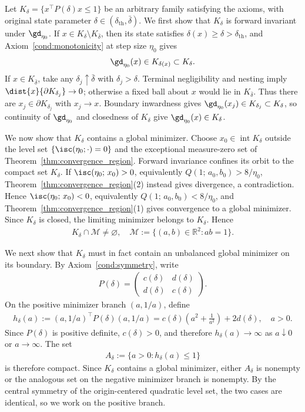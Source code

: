 \documentclass{article}
\begin{document}
Let $K_\delta=\{x^\top P(\delta)x\le 1\}$ be an arbitrary family satisfying
the axioms, with original state parameter
$\delta\in(\delta_{\mathrm{th}},\bar\delta)$. We first show that $K_\delta$
is forward invariant under $\gd_{\eta_0}$. If
$x\in K_\delta\setminus K_{\bar\delta}$, then its state satisfies
$\delta(x)\ge \delta>\delta_{\mathrm{th}}$, and
Axiom~\ref{cond:monotonicity} at step size $\eta_0$ gives
\begin{align}
\gd_{\eta_0}(x)\in K_{\delta(x)}\subset K_\delta .
\end{align}
If $x\in K_{\bar\delta}$, take any $\delta_j\uparrow\bar\delta$ with
$\delta_j>\delta$. Terminal negligibility and nesting imply
$\dist{x}{\partial K_{\delta_j}}\to0$; otherwise a fixed ball about $x$ would
lie in $K_{\bar\delta}$. Thus there are
$x_j\in\partial K_{\delta_j}$ with $x_j\to x$. Boundary inwardness gives
$\gd_{\eta_0}(x_j)\in K_{\delta_j}\subset K_\delta$, so continuity of
$\gd_{\eta_0}$ and closedness of $K_\delta$ give
$\gd_{\eta_0}(x)\in K_\delta$.

We now show that $K_\delta$ contains a global minimizer. Choose
$x_0\in\operatorname{int}K_\delta$ outside the level set
$\{\isc(\eta_0;\cdot)=0\}$ and the exceptional measure-zero set of
Theorem~\ref{thm:convergence_region}. Forward invariance confines its orbit to
the compact set $K_\delta$. If $\isc(\eta_0;\,x_0)>0$, equivalently
$Q(1;\,a_0,b_0)>8/\eta_0$, Theorem~\ref{thm:convergence_region}(2) instead
gives divergence, a contradiction. Hence $\isc(\eta_0;\,x_0)<0$, equivalently
$Q(1;\,a_0,b_0)<8/\eta_0$, and
Theorem~\ref{thm:convergence_region}(1) gives convergence to a global
minimizer. Since $K_\delta$ is closed, the limiting minimizer belongs to
$K_\delta$. Hence
\begin{align}
K_\delta\cap\mathcal M\neq\varnothing,
\quad
\mathcal M:=\{(a,b)\in\mathbb R^2:ab=1\}.
\end{align}

We next show that $K_\delta$ must in fact contain an unbalanced global
minimizer on its boundary. By Axiom~\ref{cond:symmetry}, write
\begin{align}
P(\delta)
=
\begin{pmatrix}
c(\delta) & d(\delta) \\
d(\delta) & c(\delta)
\end{pmatrix}.
\end{align}
On the positive minimizer branch $(a,1/a)$, define
\begin{align}
h_\delta(a)
:=
(a,1/a)^\top P(\delta)(a,1/a)
=
c(\delta)\left(a^2+\frac{1}{a^2}\right)+2d(\delta),
\quad a>0.
\end{align}
Since $P(\delta)$ is positive definite, $c(\delta)>0$, and therefore
$h_\delta(a)\to\infty$ as $a\downarrow 0$ or $a\to\infty$. The set
\begin{align}
A_\delta
:=
\{a>0:h_\delta(a)\le 1\}
\end{align}
is therefore compact. Since $K_\delta$ contains a global minimizer, either
$A_\delta$ is nonempty or the analogous set on the negative minimizer branch
is nonempty. By the central symmetry of the origin-centered quadratic level
set, the two cases are identical, so we work on the positive branch.
\end{document}
